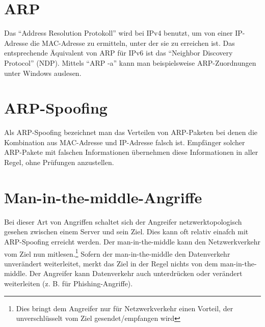 \section{ARP}
Das \enquote{Address Resolution Protokoll} wird bei IPv4 benutzt, um von einer IP-Adresse die MAC-Adresse zu ermitteln, unter der sie zu erreichen ist. Das entsprechende Äquivalent von ARP für IPv6 ist das \enquote{Neighbor Discovery Protocol} (NDP). Mittels \enquote{ARP -a} kann man beispielsweise ARP-Zuordnungen unter Windows auslesen.
\section{ARP-Spoofing}
Als ARP-Spoofing bezeichnet man das Verteilen von ARP-Paketen bei denen die Kombination aus MAC-Adresse und IP-Adresse falsch ist. Empfänger solcher ARP-Pakete mit falschen Informationen übernehmen diese Informationen in aller Regel, ohne Prüfungen anzustellen.
\section{Man-in-the-middle-Angriffe}
Bei dieser Art von Angriffen schaltet sich der Angreifer netzwerktopologisch gesehen zwischen einem Server und sein Ziel. Dies kann oft relativ einafch mit ARP-Spoofing erreicht werden. Der man-in-the-middle kann den Netzwerkverkehr vom Ziel nun mitlesen.\footnote{Dies bringt dem Angreifer nur für Netzwerkverkehr einen Vorteil, der unverschlüsselt vom Ziel gesendet/empfangen wird} Sofern der man-in-the-middle den Datenverkehr unverändert weiterleitet, merkt das Ziel in der Regel nichts von dem man-in-the-middle. Der Angreifer kann Datenverkehr auch unterdrücken oder verändert weiterleiten (z. B. für Phishing-Angriffe).

\clearpage
